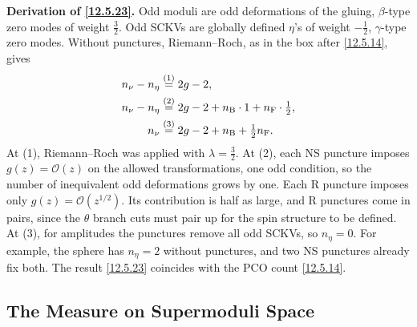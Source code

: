\begin{tcolorbox}[breakable]
	\begin{remark}
		\textbf{Derivation of \eqref{12.5.23}.} Odd moduli are odd deformations of the gluing, $\beta$-type zero modes of weight $\frac32$. Odd SCKVs are globally defined $\eta$'s of weight $-\frac12$, $\gamma$-type zero modes. Without punctures, Riemann--Roch, as in the box after \eqref{12.5.14}, gives
		\begin{align*}
			n_{\nu}-n_{\eta}&\overset{(1)}{=} 2g-2 ,\\
			n_{\nu}-n_{\eta}&\overset{(2)}{=} 2g-2+n_{\mathrm B}\cdot1+n_{\mathrm F}\cdot\tfrac12 ,\\
			n_{\nu}&\overset{(3)}{=} 2g-2+n_{\mathrm B}+\tfrac12n_{\mathrm F} .
		\end{align*}
		At (1), Riemann--Roch was applied with $\lambda=\frac32$. At (2), each NS puncture imposes $g(z)=\mathcal O(z)$ on the allowed transformations, one odd condition, so the number of inequivalent odd deformations grows by one. Each R puncture imposes only $g(z)=\mathcal O(z^{1/2})$. Its contribution is half as large, and R punctures come in pairs, since the $\theta$ branch cuts must pair up for the spin structure to be defined. At (3), for amplitudes the punctures remove all odd SCKVs, so $n_{\eta}=0$. For example, the sphere has $n_{\eta}=2$ without punctures, and two NS punctures already fix both. The result \eqref{12.5.23} coincides with the PCO count \eqref{12.5.14}.
	\end{remark}
\end{tcolorbox}

\subsection*{The Measure on Supermoduli Space}

